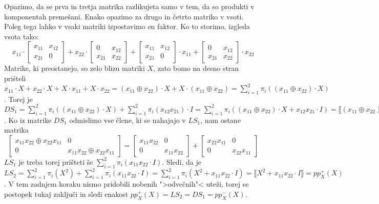\documentclass[mat1]{fmfdelo}
\begin{document}
Opazimo, da se prva in tretja matrika razlikujeta samo v tem, da so produkti v komponentah premešani. Enako opazimo za drugo in četrto matriko v vsoti. Poleg tega lahko v vsaki matriki izpostavimo en faktor. Ko to storimo, izgleda vsota tako: $$x_{11}\cdot\begin{bmatrix}
	x_{11} & x_{12} \\
	x_{21} & 0
\end{bmatrix} + x_{22}\cdot\begin{bmatrix}
	0 & x_{12}\\
	x_{21} & x_{22}
\end{bmatrix} + \begin{bmatrix}
	x_{11} & x_{12} \\
	x_{21} & 0
\end{bmatrix}\cdot x_{11} + \begin{bmatrix}
	0 & x_{12} \\
	x_{21} & x_{22}
\end{bmatrix}\cdot x_{22}$$
Matrike, ki preostanejo, so zelo blizu matriki $X$, zato bomo na desno stran prišteli $x_{11}\cdot X + x_{22}\cdot X + X\cdot x_{11} + X\cdot x_{22} = (x_{11} \oplus x_{22})\cdot X + X\cdot (x_{11} \oplus x_{22}) = \sum_{i = 1}^{2}\pi_i((x_{11} \oplus x_{22})\cdot X)$. Torej je $DS_1 = \sum_{i = 1}^2\pi_i((x_{11} \oplus x_{22})\cdot X) + \sum_{i = 1}^2\pi_i(x_{12}x_{21})\cdot I = \sum_{i = 1}^2\pi_i((x_{11} \oplus x_{22})\cdot X + x_{12}x_{21}\cdot I) = \llbracket (x_{11} \oplus x_{22})\cdot X + x_{12}x_{21}\cdot I \rrbracket = pp_X^{-}(X)$.
Ko iz matrike $DS_1$ odmislimo vse člene, ki se nahajajo v $LS_1$, nam ostane matrika $$\begin{bmatrix}
	 x_{11}x_{22} \oplus x_{22}x_{11} & 0 \\
	0 & x_{11}x_{22} \oplus x_{22}x_{11}
\end{bmatrix} = \begin{bmatrix}
x_{11}x_{22} & 0 \\
0 & x_{11}x_{22}
\end{bmatrix} + \begin{bmatrix}
x_{22}x_{11} & 0 \\
0 & x_{22}x_{11}
\end{bmatrix}$$
$LS_1$ je treba torej prišteti še $\sum_{i=1}^{2}\pi_i(x_{11}x_{22}\cdot I)$. Sledi, da je $LS_2 = \sum_{i = 1}^{2}\pi_i(X^2) + \sum_{i = 1}^{2}\pi_i(x_{11}x_{22}\cdot I) = \sum_{i = 1}^{2}\pi_i(X^2 + x_{11}x_{22}\cdot I) = \llbracket X^2 + x_{11}x_{22}\cdot I \rrbracket = pp_X^{+}(X)$. V tem zadnjem koraku nismo pridobili nobenih ">odvečnih"< uteži, torej se postopek tukaj zaključi in sledi enakost $pp_X^{+}(X) = LS_2 = DS_1 = pp_X^{-}(X)$.
\end{document}
